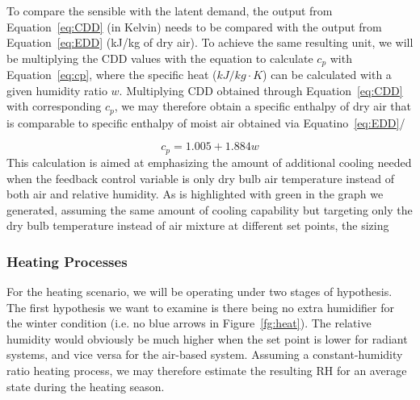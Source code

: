     To compare the sensible with the latent demand, the output from Equation~\ref{eq:CDD} (in Kelvin) needs to be compared with the output from Equation~\ref{eq:EDD} (kJ/kg of dry air). To achieve the same resulting unit, we will be multiplying the CDD values with the equation to calculate $c_p$ with Equation~\ref{eq:cp}, where the specific heat ($kJ/kg\cdot K$) can be calculated with a given  humidity ratio $w$. Multiplying CDD obtained through Equation~\ref{eq:CDD} with corresponding $c_p$, we may therefore obtain a specific enthalpy of dry air that is comparable to specific enthalpy of moist air obtained via Equatino~\ref{eq:EDD}/

    \begin{equation}
    c_p = 1.005 + 1.884 w \label{eq:cp}
    \end{equation}
    This calculation is aimed at emphasizing the amount of additional cooling needed when the feedback control variable is only dry bulb air temperature instead of both air and relative humidity. As is highlighted with green in the graph we generated, assuming the same amount of cooling capability but targeting only the dry bulb temperature instead of air mixture at different set points, the sizing  

\subsubsection{Heating Processes}
    For the heating scenario, we will be operating under two stages of hypothesis. The first hypothesis we want to examine is there being no extra humidifier for the winter condition (i.e. no blue arrows in Figure~\ref{fg:heat}). The relative humidity would obviously be much higher when the set point is lower for radiant systems, and vice versa for the air-based system. Assuming a constant-humidity ratio heating process, we may therefore estimate the resulting RH for an average state during the heating season.  

